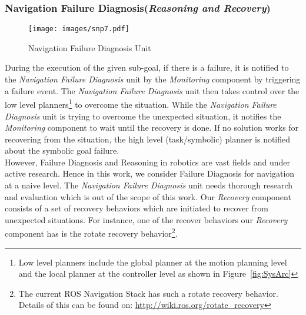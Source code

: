 \subsubsection{Navigation Failure Diagnosis(\textit{Reasoning and Recovery})}
\begin{figure}[htbp]
 \centering
 \texttt{[image: images/snp7.pdf]}
 \caption{Navigation Failure Diagnosis Unit}
 \label{Fig:Data flow summery}
\end{figure}
During the execution of the given sub-goal, if there is a failure,
it is notified to the \textit{Navigation Failure Diagnosis} unit by the \textit{Monitoring} component by triggering a failure event.
The \textit{Navigation Failure Diagnosis} unit then takes control over the low level planners\footnote[7]{Low level planners include the global planner at the motion planning level and the local planner at the controller level as shown in Figure~\ref{fig:SysArc}} 
to overcome the situation.
While the \textit{Navigation Failure Diagnosis} unit is trying to overcome the unexpected situation, it notifies the \textit{Monitoring }component to wait until the recovery is done.
If no solution works for recovering from the situation, the high level (task/symbolic) planner is notified about the symbolic goal failure. \\

However, Failure Diagnosis and Reasoning in robotics are vast fields and under active research.
Hence in this work, we consider Failure Diagnosis for navigation at a naive level. The \textit{Navigation Failure Diagnosis} unit 
needs thorough research and evaluation which is out of the scope of this work.
Our \textit{Recovery} component consists of a set of recovery behaviors which are initiated to recover from unexpected situations.
For instance, one of the recover behaviors our \textit{Recovery} component has is the rotate recovery behavior\footnote[8]{The current ROS Navigation Stack has such a rotate recovery behavior. 
Details of this can be found on: \url{http://wiki.ros.org/rotate_recovery}}.\\

\iffalse 

